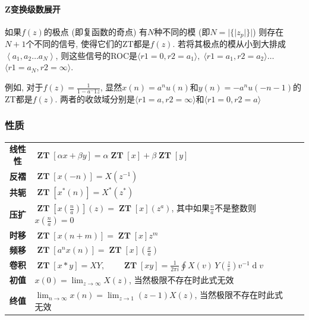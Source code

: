 \documentclass{ctexart}
\DeclareMathOperator{\ZT}{\mathbf{ZT}}
\DeclareMathOperator{\ud}{\mathrm{d}}
\begin{document}
\paragraph{Z变换级数展开}
    如果$f(z)$的极点 (即复函数的奇点) 有$N$种不同的模 (即$N=|\{|z_p|\}|$) 则存在$N+1$个不同的信号, 使得它们的ZT都是$f(z)$.
    若将其极点的模从小到大排成$\left\langle a_1, a_2\ldots a_N\right\rangle$, 
    则这些信号的ROC是$\langle r1=0, r2=a_1 \rangle,\;$$\langle r1=a_1, r2=a_2\rangle\ldots$
    $\langle r1=a_N, r2=\infty\rangle$.\par
    例如, 对于$f(z) = \frac{1}{1- a^-1z}$, 显然$x(n) = a^n u(n)$和$y(n) = -a^n u(-n-1)$的ZT都是$f(z)$.
    两者的收敛域分别是$\langle r1=a, r2=\infty\rangle$和$\langle r1=0, r2=a\rangle$
\subsubsection{性质}
    \begin{center}
    \begin{tabularx}{\textwidth}{>{\bfseries}Sl  SL}
        线性性 &  $\displaystyle \ZT[\alpha x + \beta y] = \alpha \ZT[x] + \beta \ZT[y]$\\
        反褶 & $\displaystyle \ZT[x(-n)] = X(z^{-1})$\\
        共轭 & $\displaystyle \ZT[x^*(n)] = X^*(z^*)$\\
        压扩 & $\displaystyle \ZT\left[x(\frac{n}{a})\right](z) = \ZT[x](z^a)$, 其中如果$\frac{n}{a}$不是整数则$x(\frac{n}{a}) = 0$\\
        时移 & $\displaystyle \ZT[x(n + m)] = \ZT[x]z^m$\\
        频移 & $\displaystyle \ZT[a^n x(n)] = \ZT[x]\left(\frac{x}{a}\right)$\\
        卷积 & $\displaystyle \ZT[x * y] = X Y,\qquad \ZT[x y] = \frac{1}{2 \pi i} \oint X(v) \,Y\!\left( \frac{z}{v} \right) v^{-1}\ud v  $\\
        初值 & $\displaystyle x(0) = \lim_{z \to \infty} X(z)$, 当然极限不存在时此式无效\\
        终值 & $\displaystyle \lim_{n \to \infty} x(n) = \lim_{z \to 1} (z - 1) X(z)$, 当然极限不存在时此式无效\\
    \end{tabularx}
    \end{center}
\end{document}

